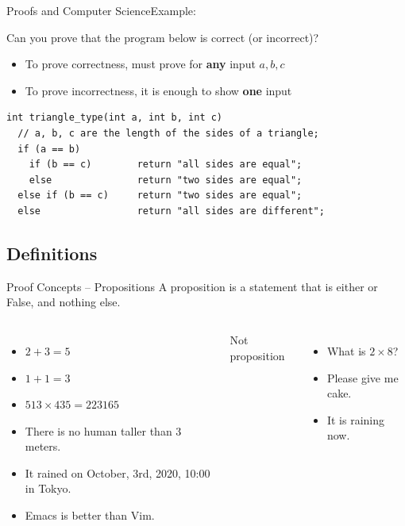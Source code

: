 \begin{frame}[fragile]{Proofs and Computer Science}{Example:}

  Can you prove that the program below is correct (or incorrect)?

  \begin{itemize}
    \item To prove correctness, must prove for {\bf any} input $a,b,c$
    \item To prove incorrectness, it is enough to show {\bf one} input
  \end{itemize}

\begin{verbatim}
int triangle_type(int a, int b, int c)
  // a, b, c are the length of the sides of a triangle;
  if (a == b)
    if (b == c)        return "all sides are equal";
    else               return "two sides are equal";
  else if (b == c)     return "two sides are equal";
  else                 return "all sides are different";
\end{verbatim}
\end{frame}

\subsection{Definitions}

\begin{frame}{Proof Concepts -- Propositions}
  A proposition is a statement that is either  or \alert{False}, and nothing else.\bigskip

  \begin{columns}[T]
    \begin{itemize}
      \item $2 + 3 = 5$
      \item $1 + 1 = 3$
      \item $513 \times 435 = 223165$
      \item There is no human taller than 3 meters.
      \item It rained on October, 3rd, 2020, 10:00 in Tokyo.
      \item Emacs is better than Vim.
    \end{itemize}
    \alert{Not proposition}
    \begin{itemize}
      \item What is $2 \times 8$?
      \item Please give me cake.
      \item It is raining now.
    \end{itemize}
  \end{columns}
\end{frame}

